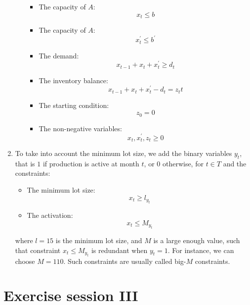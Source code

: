 \documentclass[12pt, a4paper]{report}
\begin{document}
\begin{enumerate}
\begin{itemize}
                        \begin{itemize}
                            \item The capacity of $A$: 
                                \[x_t \leq b\]
                            \item The capacity of $A$: 
                                \[x_t^{'} \leq b^{'}\]
                            \item The demand: 
                                \[x_{t-1}+x_t+x_t^{'} \geq d_t\]
                            \item The inventory balance: 
                                \[x_{t-1}+x_t+x_t^{'}-d_t = z_tt\]
                            \item The starting condition: 
                                \[z_0=0\]
                            \item The non-negative variables: 
                                \[x_t,x_t^{'},z_t \geq 0\]
                            \end{itemize}
                \end{itemize}
            \item To take into account the minimum lot size, we add the binary variables $y_t$, that is $1$ if production is active at month $t$, or $0$ otherwise, for 
                $t \in T$ and the constraints: 
                \begin{itemize}
                    \item The minimum lot size: 
                        \[x_t \geq l_{y_t}\]
                    \item The activation: 
                        \[x_t \leq M_{y_t}\]
                \end{itemize}
                where $l = 15$ is the minimum lot size, and $M$ is a large enough value, such that constraint $x_t \leq M_{y_t}$ is redundant when $y_t=1$. For instance, 
                we can choose $M = 110$. Such constraints are usually called big-$M$ constraints. 
        \end{enumerate}

\newpage

\chapter{Exercise session III}
\end{document}
